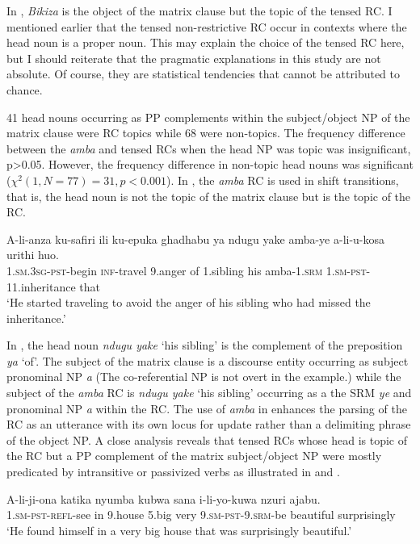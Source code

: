 \documentclass[output=paper,colorlinks,citecolor=brown]{langscibook}
\begin{document}
In , \textit{Bikiza} is the object of the matrix clause but the topic of the tensed RC. I mentioned earlier that the tensed non-restrictive RC occur in contexts where the head noun is a proper noun. This may explain the choice of the tensed RC here, but I should reiterate that the pragmatic explanations in this study are not absolute. Of course, they are statistical tendencies that cannot be attributed to chance.

41 head nouns occurring as PP complements within the subject/object NP of the matrix clause were RC topics while 68 were non-topics. The frequency difference between the \textit{amba} and tensed RCs when the head NP was topic was insignificant, p>0.05. However, the frequency difference in non-topic head nouns was significant ($\chi^2 (1,N=77)=31, p<0.001$). In , the \textit{amba} RC is used in shift transitions, that is, the head noun is not the topic of the matrix clause but is the topic of the RC.

\ea%
    \label{ex:mwamzandi:30}
    \gll    A-li-anza ku-safiri ili ku-epuka ghadhabu ya ndugu yake amba-ye a-li-u-kosa urithi huo.\\
            \textsc{1.sm.3sg-pst-}begin \textsc{inf-}travel 9.anger of 1.sibling his amba\textsc{-1.srm} \textsc{1.sm-pst-}11.inheritance that\\
    \glt    ‘He started traveling to avoid the anger of his sibling who had missed the inheritance.’
\z

In , the head noun \textit{ndugu yake} ‘his sibling’ is the complement of the preposition \textit{ya} ‘of’. The subject of the matrix clause is a discourse entity occurring as subject pronominal NP \textit{a} (The co-referential NP is not overt in the example.) while the subject of the \textit{amba} RC is \textit{ndugu yake} ‘his sibling’ occurring as a the SRM \textit{ye} and pronominal NP \textit{a} within the RC. The use of \textit{amba} in  enhances the parsing of the RC as an utterance with its own locus for update rather than a delimiting phrase of the object NP. A close analysis reveals that tensed RCs whose head is topic of the RC but a PP complement of the matrix subject/object NP were mostly predicated by intransitive or passivized verbs as illustrated in  and .

\ea%
    \label{ex:mwamzandi:31}
    \gll    A-li-ji-ona katika nyumba kubwa sana i-li-yo-kuwa nzuri ajabu.\\
            \textsc{1.sm-pst-refl-}see in 9.house 5.big very \textsc{9.sm-pst-9.srm-}be beautiful surprisingly\\
    \glt    ‘He found himself in a very big house that was surprisingly beautiful.’
\z
\end{document}

